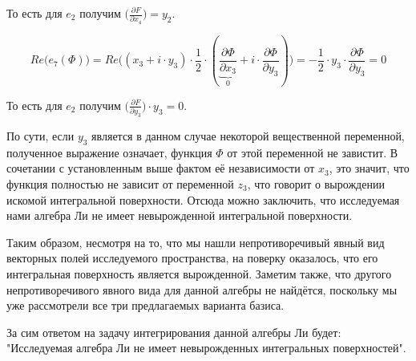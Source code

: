 \documentclass[a4paper]{article}
\begin{document}
То есть для $e_{2}$ получим $\Big(\frac{\partial F}{\partial x_{4}}\Big) = y_{2}$.

\begin{equation*}
    Re\Big(e_{7}(\Phi)\Big) = Re\Big( (x_{3}+i\cdot y_{3}) \cdot \frac{1}{2} \cdot ( \underbrace{\frac{\partial \Phi}{\partial x_{3}}}_{0} + i \cdot \frac{\partial \Phi}{\partial y_{3}}) \Big)
     = - \frac{1}{2} \cdot y_{3} \cdot \frac{\partial \Phi}{\partial y_{3}} = 0
\end{equation*}

То есть для $e_{2}$ получим $\Big(\frac{\partial F}{\partial y_{3}}\Big) \cdot y_{3} = 0$.

По сути, если $y_{3}$ является в данном случае некоторой вещественной переменной, полученное выражение означает, функция $\Phi$ от этой переменной не завистит. В сочетании с установленным выше фактом её независимости от $x_{3}$, это значит, что функция полностью не зависит от переменной $z_{3}$, что говорит о вырождении искомой интегральной поверхности. Отсюда можно заключить, что исследуемая нами алгебра Ли не имеет невырожденной интегральной поверхности.

Таким образом, несмотря на то, что мы нашли непротиворечивый явный вид векторных полей исследуемого пространства, на поверку оказалось, что его интегральная поверхность является вырожденной. Заметим также, что другого непротиворечивого явного вида для данной алгебры не найдётся, поскольку мы уже рассмотрели все три предлагаемых варианта базиса.

За сим ответом на задачу интегрирования данной алгебры Ли будет: "Исследуемая алгебра Ли не имеет невырожденных интегральных поверхностей".
\newpage
{}

\end{document}
